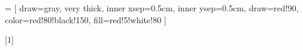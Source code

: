 \newcommand{\black}[1]{{\color{black}#1}}%

\newcommand{\PK}[1]{\underline{#1}}
\newcommand{\FK}[1]{\dashuline{#1}}
\newcommand{\FPK}[1]{\PK{\FK{#1}}}

\newcommand{\red}[1]{{\color{red}#1}}



\newcommand{\warningsign}{\tikz[baseline=0.1cm] \node[shape=regular polygon, regular polygon sides=3, inner sep=1pt, draw, thick] {\textbf{!}};}


 = [
draw=gray, very thick,
inner xsep=0.5cm, inner ysep=0.5cm, draw=red!90, color=red!80!black!150, fill=red!5!white!80
]

[1]{%
	\begin{center}
	\end{center}
}